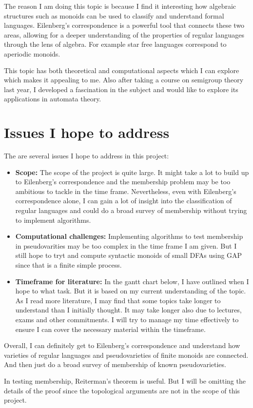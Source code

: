 The reason I am doing this topic is because I find it interesting how algebraic structures such as monoids can be used to classify and understand formal languages.
Eilenberg's correspondence is a powerful tool that connects these two areas, allowing for a deeper understanding of the properties of regular languages through the lens of algebra.
For example star free languages correspond to aperiodic monoids.

This topic has both theoretical and computational aspects which I can explore which makes it appealing to me. Also after taking
a course on semigroup theory last year, I developed a fascination in the subject and would like to explore its applications in automata theory.

\section*{Issues I hope to address}
The are several issues I hope to address in this project:
\begin{itemize}
    \item {\bf Scope:} The scope of the project is quite large. It might take a lot to build up to Eilenberg's correspondence and the membership problem may be too ambitious to tackle in the time frame. 
    Nevertheless, even with Eilenberg's correspondence alone, I can gain a lot of insight into the classification of regular languages and could do a broad survey of membership without trying to implement algorithms.
    \item {\bf Computational challenges:} Implementing algorithms to test membership in pseudovarities may be too complex in the time frame I am given. But I still hope to tryt and compute syntactic monoids of small DFAs using GAP since that is a finite simple process.
    \item {\bf Timeframe for literature:} In the gantt chart below, I have outlined when I hope to what task. But it is based on my current understanding of the topic. As I read more literature, I may find that some topics take longer to understand than I initially thought.
    It may take longer also due to lectures, exams and other commitments. I will try to manage my time effectively to ensure I can cover the necessary material within the timeframe. 
 \end{itemize}

Overall, I can definitely get to Eilenberg's correspondence and understand how varieties of regular languages and pseudovarieties of finite monoids are connected. And then just do a broad survey of membership of known pseudovarieties.

 In testing membership, Reiterman's theorem is useful. But I will be omitting the details of the proof since the topological arguments are not in the scope of this project.